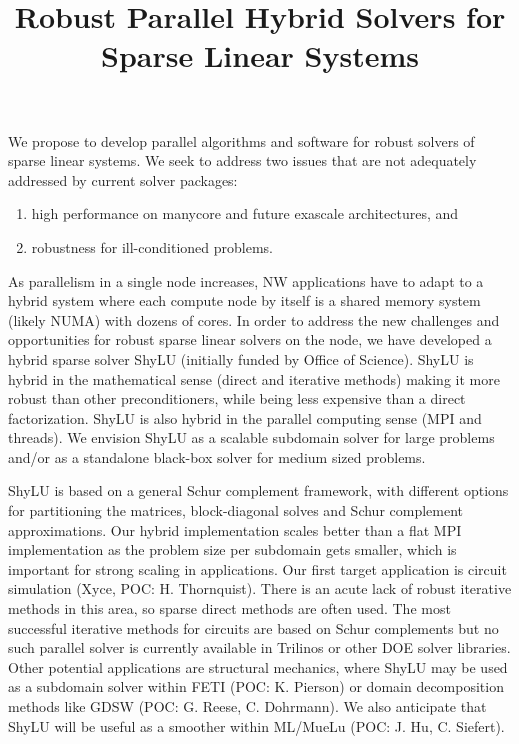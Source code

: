 \documentclass[10pt]{amsart}
\date{}
\title{Robust Parallel Hybrid Solvers for Sparse Linear Systems}
\begin{document}
\maketitle

We propose to develop parallel algorithms and software for robust solvers
of sparse linear systems. We seek to address two issues that
are not adequately addressed by current solver packages:
\begin{enumerate}
\item high performance on manycore and future exascale architectures, and
\item robustness for ill-conditioned problems.
\end{enumerate}

As parallelism in a single node increases, NW applications
have to adapt to a hybrid system where each compute node by itself
is a shared memory system (likely NUMA) with dozens of cores. 
In order to address the new challenges and opportunities 
for robust sparse linear solvers on the node,
we have developed a hybrid sparse solver ShyLU (initially funded by 
Office of Science). ShyLU is hybrid in the
mathematical sense (direct and iterative methods) making it more
robust than other preconditioners, while being less expensive
than a direct factorization.  ShyLU is also hybrid in the parallel
computing sense (MPI and threads). We envision ShyLU as a scalable
subdomain solver for large problems and/or as a standalone black-box solver
for medium sized problems.

ShyLU is based on a general Schur complement framework, with different options
for partitioning the matrices, block-diagonal solves and Schur complement
approximations.  Our hybrid implementation scales better than
a flat MPI implementation as the problem size per subdomain gets smaller, 
which is important for strong scaling in applications.
Our first target application is circuit simulation (Xyce, POC: H. Thornquist). 
There is an acute lack of robust iterative methods in this area, so sparse
direct methods are often used. The most successful iterative methods
for circuits are based on Schur complements but no such parallel solver
is currently available in Trilinos or other DOE solver libraries.
%
Other potential applications are structural mechanics, where ShyLU
may be used as a subdomain solver within FETI (POC: K. Pierson) or
domain decomposition methods like GDSW (POC: G. Reese, C. Dohrmann). 
We also anticipate that ShyLU
will be useful as a smoother within ML/MueLu (POC: J. Hu, C. Siefert).
\end{document}

